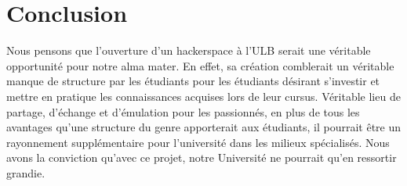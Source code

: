 \documentclass[a4paper]{article}
\begin{document}
\section{Conclusion} %
Nous  pensons que l’ouverture d’un hackerspace à l’ULB serait une véritable  opportunité pour notre alma mater. En effet, sa création comblerait  un véritable manque de structure par les étudiants pour les étudiants  désirant s’investir et mettre en pratique les connaissances acquises  lors de leur cursus. Véritable lieu de partage, d’échange et  d’émulation pour les passionnés, en plus de tous les avantages qu’une  structure du genre apporterait aux étudiants, il pourrait être un  rayonnement supplémentaire pour l’université dans les milieux  spécialisés.
Nous avons la conviction qu’avec ce projet, notre Université ne pourrait qu’en ressortir grandie.
\end{document}
